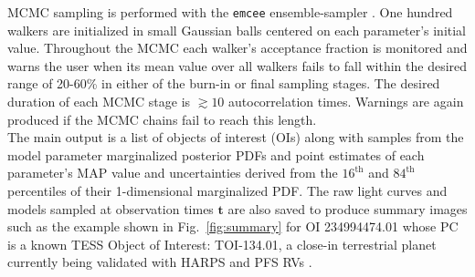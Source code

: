 MCMC sampling is performed with the \texttt{emcee}
ensemble-sampler \citep{foremanmackey13}. One hundred walkers are initialized in small Gaussian balls
centered on each parameter's initial value. Throughout the MCMC each walker's acceptance
fraction is monitored and warns the user when its mean value over all walkers fails to
fall within the desired range of 20-60\% in either of the burn-in or final sampling stages.
The desired duration of each MCMC stage is $\gtrsim 10$ autocorrelation times. Warnings are again produced
if the MCMC chains fail to reach this length. \\

The main \pipeline{} output is a list of objects of interest (OIs)
along with samples from the model parameter marginalized
posterior PDFs and point estimates of each parameter's MAP value and uncertainties derived from the
$16^{\text{th}}$ and $84^{\text{th}}$ percentiles of their 1-dimensional marginalized PDF.
The raw light curves and models
sampled at observation times $\mathbf{t}$ are also saved to produce summary images 
such as the example shown in Fig.~\ref{fig:summary} for OI 234994474.01  
whose PC is a known TESS Object of Interest: TOI-134.01, a close-in terrestrial planet currently being
validated with HARPS and PFS RVs \citep{astudillodefru19}. \\


